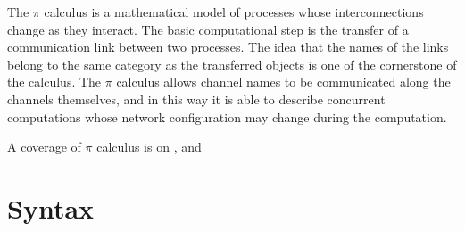 


The $\pi$ calculus is a mathematical model of processes whose interconnections change as they interact. The basic computational step is the transfer of a communication link between two processes. The idea that the names of the links belong to the same category as the transferred objects is one of the cornerstone of the calculus. The $\pi$ calculus allows channel names to be communicated along the channels themselves, and in this way it is able to describe concurrent computations whose network configuration may change during the computation.

A coverage of $\pi$ calculus is on \cite{parrow}, \cite{sangiorgiwalker} and \cite{milner}

\section{Syntax}

